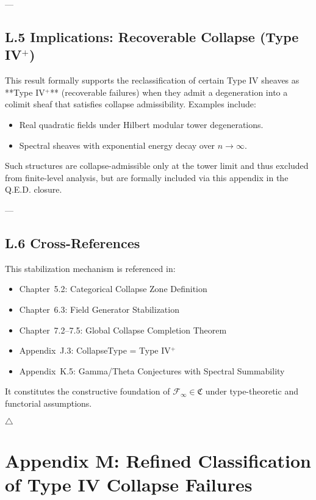 \documentclass[11pt]{article}
\begin{document}
---

\subsection*{L.5 Implications: Recoverable Collapse (Type IV$^+$)}

This result formally supports the reclassification of certain Type IV sheaves as **Type IV$^+$** (recoverable failures) when they admit a degeneration into a colimit sheaf that satisfies collapse admissibility.  
Examples include:
\begin{itemize}
  \item Real quadratic fields under Hilbert modular tower degenerations.
  \item Spectral sheaves with exponential energy decay over \( n \to \infty \).
\end{itemize}

Such structures are collapse-admissible only at the tower limit and thus excluded from finite-level analysis, but are formally included via this appendix in the Q.E.D. closure.

---

\subsection*{L.6 Cross-References}

This stabilization mechanism is referenced in:
\begin{itemize}
  \item Chapter~5.2: Categorical Collapse Zone Definition
  \item Chapter~6.3: Field Generator Stabilization
  \item Chapter~7.2–7.5: Global Collapse Completion Theorem
  \item Appendix~J.3: CollapseType = Type IV$^+$
  \item Appendix~K.5: Gamma/Theta Conjectures with Spectral Summability
\end{itemize}

It constitutes the constructive foundation of \( \mathcal{F}_\infty \in \mathfrak{C} \) under type-theoretic and functorial assumptions.

\hfill \( \triangle \)



\appendix
\section*{Appendix M: Refined Classification of Type IV Collapse Failures}
\end{document}
